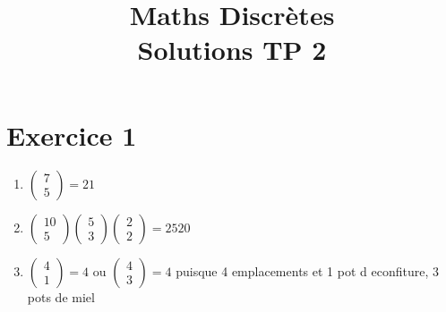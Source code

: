 \documentclass[fontsize=10pt]{article}
\title{\textbf{Maths Discrètes }\\Solutions TP 2 }
\date{}
\begin{document}
\maketitle %


\section*{Exercice 1}
\begin{enumerate}
\item $\begin{pmatrix}
7 \\ 5
\end{pmatrix} = 21$
\item $\begin{pmatrix} 
10\\
5
\end{pmatrix}
\begin{pmatrix} 
5\\
3
\end{pmatrix}
\begin{pmatrix} 
2\\
2
\end{pmatrix} = 2520$
\item $ 
\begin{pmatrix} 
4\\
1
\end{pmatrix} = 4$ ou $
\begin{pmatrix} 
4\\
3
\end{pmatrix} =4$ puisque 4 emplacements et 1 pot d econfiture, 3 pots de miel
\end{enumerate}
\end{document}
